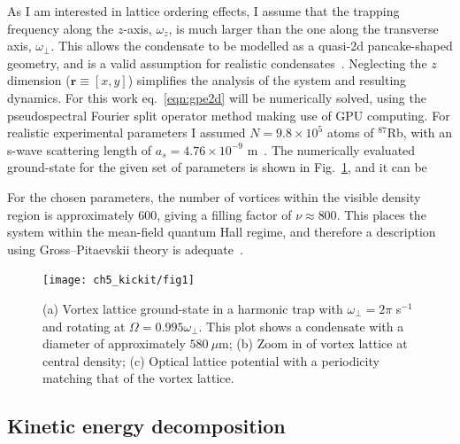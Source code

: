 As I am interested in lattice ordering effects, I assume that the trapping frequency along the $z$-axis, $\omega_z$, is much larger than the one along the transverse axis, $\omega_\perp$. This allows the condensate to be modelled as a quasi-2d pancake-shaped geometry, and is a valid assumption for realistic condensates~\cite{BEC:Fetter_revmodphys_2009}. Neglecting the $z$ dimension ($\textbf{r}\equiv [x,y]$) simplifies the analysis of the system and resulting dynamics. For this work eq.~\eqref{eqn:gpe2d} will be numerically solved, using the pseudospectral Fourier split operator method making use of GPU computing\cite{NUMERICS}. For realistic experimental parameters I assumed  $N=9.8\times 10^5$ atoms of $^{87}$Rb, with an s-wave scattering length of $a_s=4.76\times10^{-9}$ m~\cite{AO:Roberts_prl_1998}. The numerically evaluated ground-state for the given set of parameters is shown in Fig.~\ref{fig:vlatt_gnd}, and it can be

For the chosen parameters, the number of vortices within the visible density region is approximately 600, giving a filling factor of $\nu \approx 800 $. This places the system within the mean-field quantum Hall regime, and therefore a description using Gross--Pitaevskii theory is adequate~\cite{Vtx:Schweikhard_prl_2004}.

\begin{figure}[ht]
    \centering
    \texttt{[image: ch5\_kickit/fig1]}
    \caption[Comparison of vortex lattice and optical lattice structures.]{(a) Vortex lattice ground-state in a harmonic trap with $\omega_\perp=2\pi$ s$^{-1}$ and rotating at $\Omega=0.995\omega_\perp$. This plot shows a condensate with a diameter of approximately $580~\mu\textrm{m}$; (b) Zoom in of vortex lattice at central density; (c) Optical lattice potential with a periodicity matching that of the vortex lattice.}
    \label{fig:vlatt_gnd}
\end{figure}

\subsection{Kinetic energy decomposition}


